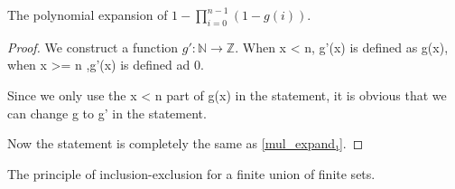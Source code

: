 \begin{lemma}\label{mul_expand₀}
  \leanok
  The polynomial expansion of \(1 - \prod_{i=0}^{n-1} (1 - g(i))\).
\end{lemma}

\begin{proof}
  \leanok
  We construct a function \( g' : \mathbb{N} \to \mathbb{Z} \). When x < n, g'(x) is defined as g(x), when x >= n ,g'(x) is defined ad 0.

  Since we only use the x < n part of g(x) in the statement, it is obvious that we can change g to g' in the statement.

  Now the statement is completely the same as \ref{mul_expand₁}. 
\end{proof}

\begin{theorem}\label{Principle_of_Inclusion_Exclusion}
  \leanok
  The principle of inclusion-exclusion for a finite union of finite sets.
\end{theorem}

